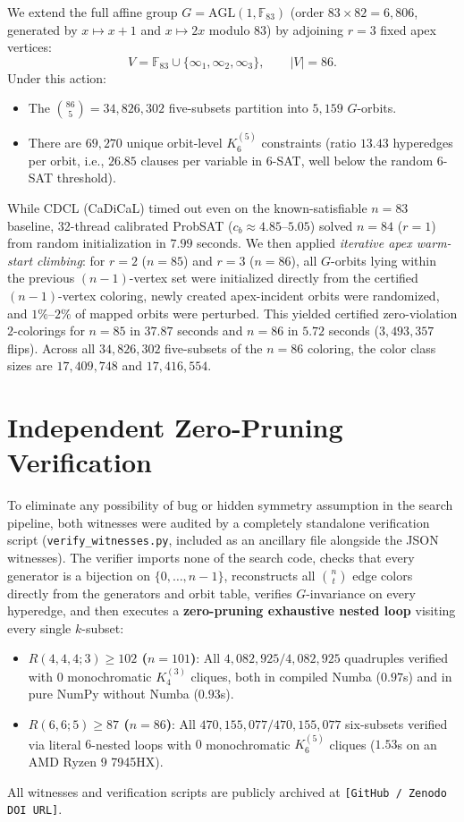 \documentclass[11pt,a4paper]{article}
\begin{document}
We extend the full affine group $G = \mathrm{AGL}(1, \mathbb{F}_{83})$ (order $83 \times 82 = 6{,}806$, generated by $x \mapsto x+1$ and $x \mapsto 2x$ modulo $83$) by adjoining $r = 3$ fixed apex vertices:
\[
V = \mathbb{F}_{83} \cup \{\infty_1, \infty_2, \infty_3\}, \qquad |V| = 86.
\]
Under this action:
\begin{itemize}
    \item The $\binom{86}{5} = 34{,}826{,}302$ five-subsets partition into $5{,}159$ $G$-orbits.
    \item There are $69{,}270$ unique orbit-level $K_6^{(5)}$ constraints (ratio $13.43$ hyperedges per orbit, i.e., $26.85$ clauses per variable in 6-SAT, well below the random 6-SAT threshold).
\end{itemize}
While CDCL (CaDiCaL) timed out even on the known-satisfiable $n=83$ baseline, 32-thread calibrated ProbSAT ($c_b \approx 4.85\text{--}5.05$) solved $n = 84$ ($r=1$) from random initialization in $7.99$ seconds. We then applied \emph{iterative apex warm-start climbing}: for $r = 2$ ($n = 85$) and $r = 3$ ($n = 86$), all $G$-orbits lying within the previous $(n-1)$-vertex set were initialized directly from the certified $(n-1)$-vertex coloring, newly created apex-incident orbits were randomized, and $1\%\text{--}2\%$ of mapped orbits were perturbed. This yielded certified zero-violation $2$-colorings for $n = 85$ in $37.87$ seconds and $n = 86$ in $5.72$ seconds ($3{,}493{,}357$ flips). Across all $34{,}826{,}302$ five-subsets of the $n=86$ coloring, the color class sizes are $17{,}409{,}748$ and $17{,}416{,}554$.

\section{Independent Zero-Pruning Verification}
To eliminate any possibility of bug or hidden symmetry assumption in the search pipeline, both witnesses were audited by a completely standalone verification script (\texttt{verify\_witnesses.py}, included as an ancillary file alongside the JSON witnesses). The verifier imports none of the search code, checks that every generator is a bijection on $\{0, \dots, n-1\}$, reconstructs all $\binom{n}{t}$ edge colors directly from the generators and orbit table, verifies $G$-invariance on every hyperedge, and then executes a \textbf{zero-pruning exhaustive nested loop} visiting every single $k$-subset:
\begin{itemize}
    \item \textbf{$R(4,4,4;3) \ge 102$ ($n = 101$)}: All $4{,}082{,}925 / 4{,}082{,}925$ quadruples verified with $0$ monochromatic $K_4^{(3)}$ cliques, both in compiled Numba ($0.97$s) and in pure NumPy without Numba ($0.93$s).
    \item \textbf{$R(6,6;5) \ge 87$ ($n = 86$)}: All $470{,}155{,}077 / 470{,}155{,}077$ six-subsets verified via literal $6$-nested loops with $0$ monochromatic $K_6^{(5)}$ cliques ($1.53$s on an AMD Ryzen 9 7945HX).
\end{itemize}
All witnesses and verification scripts are publicly archived at \texttt{[GitHub / Zenodo DOI URL]}.
\end{document}

